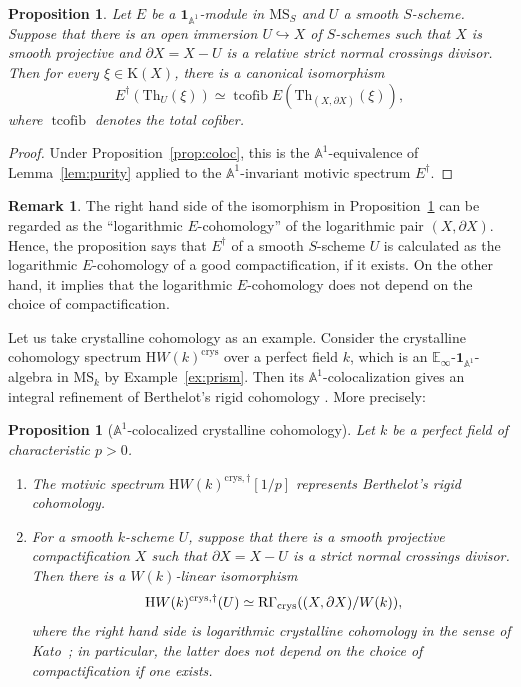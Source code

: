 \documentclass{amsart}
\numberwithin{equation}{section}
\theoremstyle{plain}
\newtheorem{proposition}[equation]{Proposition}
\theoremstyle{definition}
\newtheorem{remark}[equation]{Remark}
\let\bb=\mathbb
\def\A{\bb A}
\def\1{\mathbf 1}
\let\into=\hookrightarrow
\def\Th{\mathrm{Th}}
\def\HH{\mathrm{H}}
\def\E{\mathbb{E}}
\def\K{\mathrm{K}{}}
\def\MS{\mathrm{MS}}
\def\setminus{-}
\newcommand{\map}{\operatorname{map}}
\newcommand{\crys}{\mathrm{crys}}
\begin{document}
\begin{proposition}\label{prop:log}
Let $E$ be a $\1_{\A^1}$-module in $\MS_S$ and $U$ a smooth $S$-scheme.
Suppose that there is an open immersion $U\into X$ of $S$-schemes such that $X$ is smooth projective and $\partial X=X\setminus U$ is a relative strict normal crossings divisor.
Then for every $\xi\in\K(X)$, there is a canonical isomorphism
\[
	E^\dagger(\Th_U(\xi)) \simeq \operatorname{tcofib} E(\Th_{(X,\partial X)}(\xi)),
\]
where $\operatorname{tcofib}$ denotes the total cofiber. %
\end{proposition}

\begin{proof}
Under Proposition~\ref{prop:coloc}, this is the $\A^1$-equivalence of Lemma~\ref{lem:purity} applied to the $\A^1$-invariant motivic spectrum $E^\dagger$.
\end{proof}

\begin{remark}
The right hand side of the isomorphism in Proposition~\ref{prop:log} can be regarded as the ``logarithmic $E$-cohomology'' of the logarithmic pair $(X,\partial X)$.
Hence, the proposition says that $E^\dagger$ of a smooth $S$-scheme $U$ is calculated as the logarithmic $E$-cohomology of a good compactification, if it exists.
On the other hand, it implies that the logarithmic $E$-cohomology does not depend on the choice of compactification.
\end{remark}

Let us take crystalline cohomology as an example.
Consider the crystalline cohomology spectrum $\HH W(k)^\crys$ over a perfect field $k$, which is an $\E_\infty$-$\1_{\A^1}$-algebra in $\MS_k$ by Example~\ref{ex:prism}.
Then its $\A^1$-colocalization gives an integral refinement of Berthelot's rigid cohomology \cite{Ber}. 
More precisely:

\begin{proposition}[$\A^1$-colocalized crystalline cohomology]\label{prop:crys}
Let $k$ be a perfect field of characteristic $p>0$.
\begin{enumerate}
\item The motivic spectrum $\HH W(k)^{\crys,\dagger}[1/p]$ represents Berthelot's rigid cohomology.
\item For a smooth $k$-scheme $U$, suppose that there is a smooth projective compactification $X$ such that $\partial X=X\setminus U$ is a strict normal crossings divisor.
Then there is a $W(k)$-linear isomorphism
\[
	\HH W(k)^{\crys,\dagger}(U) \simeq \mathrm{R}\Gamma_\crys((X,\partial X)/W(k)) \rlap,
\]
where the right hand side is logarithmic crystalline cohomology in the sense of Kato~\cite{Kat}; in particular, the latter does not depend on the choice of compactification if one exists.
\end{enumerate}
\end{proposition}
\end{document}

